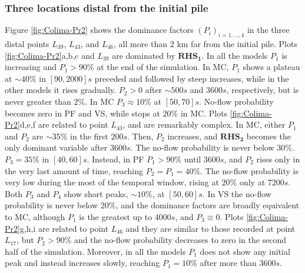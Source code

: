 \documentclass{article}
\begin{document}
\subsubsection{Three locations distal from the initial pile}
Figure \ref{fig:Colima-Pr2} shows the dominance factors $(P_i)_{i=1,\dots,4}$ in the three distal points $L_{39}$, $L_{43}$, and $L_{46}$, all more than 2 km far from the initial pile. Plots \ref{fig:Colima-Pr2}a,b,c and $L_{39}$ are dominated by $\boldsymbol{RHS_1}$. In all the models $P_1$ is increasing and $P_1>90\%$ at the end of the simulation. In MC, $P_1$ shows a plateau at $\sim 40\%$ in $[90,2000] s$ preceded and followed by steep increases, while in the other models it rises gradually. $P_2>0$ after $\sim 500 s$ and $3600 s$, respectively, but is never greater than $2\%$. In MC $P_3 \approx 10\%$ at $[50,70] s$. No-flow probability becomes zero in PF and VS, while stops at $20\%$ in MC. Plots \ref{fig:Colima-Pr2}d,e,f are related to point $L_{43}$, and are remarkably complex. In MC, either $P_1$ and $P_2$ are $\sim 35\%$ in the first $200 s$. Then, $P_2$ increases, and $\boldsymbol{RHS_2}$ becomes the only dominant variable after $3600 s$. The no-flow probability is never below $30\%$. $P_3=35\%$ in $[40, 60] s$. Instead, in PF $P_1>90\%$ until $3600 s$, and $P_2$ rises only in the very last amount of time, reaching $P_2=P_1=40\%$. The no-flow probability is very low during the most of the temporal window, rising at $20\%$ only at $7200 s$. Both $P_3$ and $P_4$ show short peaks, $\sim 10\%$, at $[50,60] s$. In VS the no-flow probability is never below $20\%$, and the dominance factors are broadly equivalent to MC, although $P_1$ is the greatest up to $4000 s$, and $P_3\equiv0$. Plots \ref{fig:Colima-Pr2}g,h,i are related to point $L_{46}$ and they are similar to those recorded at point $L_{17}$, but $P_2>90\%$ and the no-flow probability decreases to zero in the second half of the simulation. Moreover, in all the models $P_1$ does not show any initial peak and instead increases slowly, reaching $P_1=10\%$ after more than $3600 s$.
\end{document}
